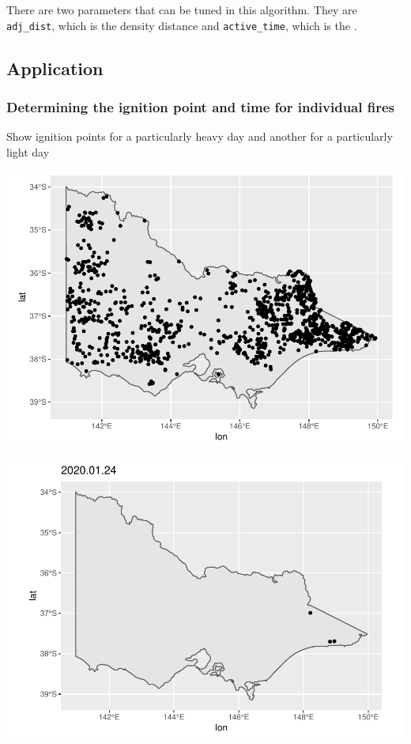 There are two parameters that can be tuned in this algorithm. They are
\texttt{adj\_dist}, which is the density distance and
\texttt{active\_time}, which is the .

\hypertarget{application}{%
\subsection{Application}\label{application}}

\hypertarget{determining-the-ignition-point-and-time-for-individual-fires}{%
\subsubsection{Determining the ignition point and time for individual
fires}\label{determining-the-ignition-point-and-time-for-individual-fires}}

Show ignition points for a particularly heavy day and another for a
particularly light day

\begin{Schunk}

\includegraphics[width=0.8\linewidth]{clustering_paper_files/figure-latex/unnamed-chunk-4-1} \end{Schunk}

\begin{Schunk}

\includegraphics[width=0.8\linewidth]{clustering_paper_files/figure-latex/unnamed-chunk-6-1} \end{Schunk}

